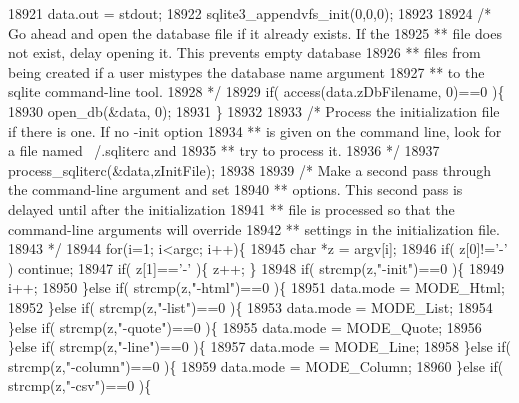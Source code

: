 \begin{DoxyCode}
{{{{18921   data.out = stdout;
18922   sqlite3_appendvfs_init(0,0,0);
18923 
18924   \textcolor{comment}{/* Go ahead and open the database file if it already exists.  If the}
18925 \textcolor{comment}{  ** file does not exist, delay opening it.  This prevents empty database}
18926 \textcolor{comment}{  ** files from being created if a user mistypes the database name argument}
18927 \textcolor{comment}{  ** to the sqlite command-line tool.}
18928 \textcolor{comment}{  */}
18929   \textcolor{keywordflow}{if}( access(data.zDbFilename, 0)==0 )\{
18930     open_db(&data, 0);
18931   \}
18932 
18933   \textcolor{comment}{/* Process the initialization file if there is one.  If no -init option}
18934 \textcolor{comment}{  ** is given on the command line, look for a file named ~/.sqliterc and}
18935 \textcolor{comment}{  ** try to process it.}
18936 \textcolor{comment}{  */}
18937   process_sqliterc(&data,zInitFile);
18938 
18939   \textcolor{comment}{/* Make a second pass through the command-line argument and set}
18940 \textcolor{comment}{  ** options.  This second pass is delayed until after the initialization}
18941 \textcolor{comment}{  ** file is processed so that the command-line arguments will override}
18942 \textcolor{comment}{  ** settings in the initialization file.}
18943 \textcolor{comment}{  */}
18944   \textcolor{keywordflow}{for}(i=1; i<argc; i++)\{
18945     \textcolor{keywordtype}{char} *z = argv[i];
18946     \textcolor{keywordflow}{if}( z[0]!=\textcolor{charliteral}{'-'} ) \textcolor{keywordflow}{continue};
18947     \textcolor{keywordflow}{if}( z[1]==\textcolor{charliteral}{'-'} )\{ z++; \}
18948     \textcolor{keywordflow}{if}( strcmp(z,\textcolor{stringliteral}{"-init"})==0 )\{
18949       i++;
18950     \}\textcolor{keywordflow}{else} \textcolor{keywordflow}{if}( strcmp(z,\textcolor{stringliteral}{"-html"})==0 )\{
18951       data.mode = MODE_Html;
18952     \}\textcolor{keywordflow}{else} \textcolor{keywordflow}{if}( strcmp(z,\textcolor{stringliteral}{"-list"})==0 )\{
18953       data.mode = MODE_List;
18954     \}\textcolor{keywordflow}{else} \textcolor{keywordflow}{if}( strcmp(z,\textcolor{stringliteral}{"-quote"})==0 )\{
18955       data.mode = MODE_Quote;
18956     \}\textcolor{keywordflow}{else} \textcolor{keywordflow}{if}( strcmp(z,\textcolor{stringliteral}{"-line"})==0 )\{
18957       data.mode = MODE_Line;
18958     \}\textcolor{keywordflow}{else} \textcolor{keywordflow}{if}( strcmp(z,\textcolor{stringliteral}{"-column"})==0 )\{
18959       data.mode = MODE_Column;
18960     \}\textcolor{keywordflow}{else} \textcolor{keywordflow}{if}( strcmp(z,\textcolor{stringliteral}{"-csv"})==0 )\{
}}}}
\end{DoxyCode}
